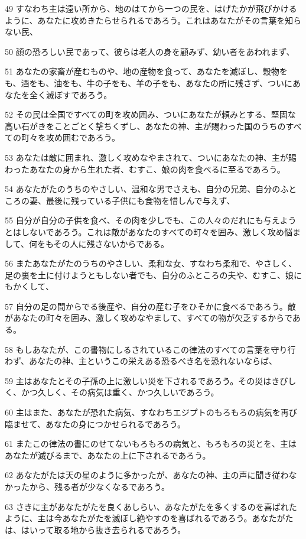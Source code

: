 \par 49 すなわち主は遠い所から、地のはてから一つの民を、はげたかが飛びかけるように、あなたに攻めきたらせられるであろう。これはあなたがその言葉を知らない民、
\par 50 顔の恐ろしい民であって、彼らは老人の身を顧みず、幼い者をあわれまず、
\par 51 あなたの家畜が産むものや、地の産物を食って、あなたを滅ぼし、穀物をも、酒をも、油をも、牛の子をも、羊の子をも、あなたの所に残さず、ついにあなたを全く滅ぼすであろう。
\par 52 その民は全国ですべての町を攻め囲み、ついにあなたが頼みとする、堅固な高い石がきをことごとく撃ちくずし、あなたの神、主が賜わった国のうちのすべての町々を攻め囲むであろう。
\par 53 あなたは敵に囲まれ、激しく攻めなやまされて、ついにあなたの神、主が賜わったあなたの身から生れた者、むすこ、娘の肉を食べるに至るであろう。
\par 54 あなたがたのうちのやさしい、温和な男でさえも、自分の兄弟、自分のふところの妻、最後に残っている子供にも食物を惜しんで与えず、
\par 55 自分が自分の子供を食べ、その肉を少しでも、この人々のだれにも与えようとはしないであろう。これは敵があなたのすべての町々を囲み、激しく攻め悩まして、何をもその人に残さないからである。
\par 56 またあなたがたのうちのやさしい、柔和な女、すなわち柔和で、やさしく、足の裏を土に付けようともしない者でも、自分のふところの夫や、むすこ、娘にもかくして、
\par 57 自分の足の間からでる後産や、自分の産む子をひそかに食べるであろう。敵があなたの町々を囲み、激しく攻めなやまして、すべての物が欠乏するからである。
\par 58 もしあなたが、この書物にしるされているこの律法のすべての言葉を守り行わず、あなたの神、主というこの栄えある恐るべき名を恐れないならば、
\par 59 主はあなたとその子孫の上に激しい災を下されるであろう。その災はきびしく、かつ久しく、その病気は重く、かつ久しいであろう。
\par 60 主はまた、あなたが恐れた病気、すなわちエジプトのもろもろの病気を再び臨ませて、あなたの身につかせられるであろう。
\par 61 またこの律法の書にのせてないもろもろの病気と、もろもろの災とを、主はあなたが滅びるまで、あなたの上に下されるであろう。
\par 62 あなたがたは天の星のように多かったが、あなたの神、主の声に聞き従わなかったから、残る者が少なくなるであろう。
\par 63 さきに主があなたがたを良くあしらい、あなたがたを多くするのを喜ばれたように、主は今あなたがたを滅ぼし絶やすのを喜ばれるであろう。あなたがたは、はいって取る地から抜き去られるであろう。
